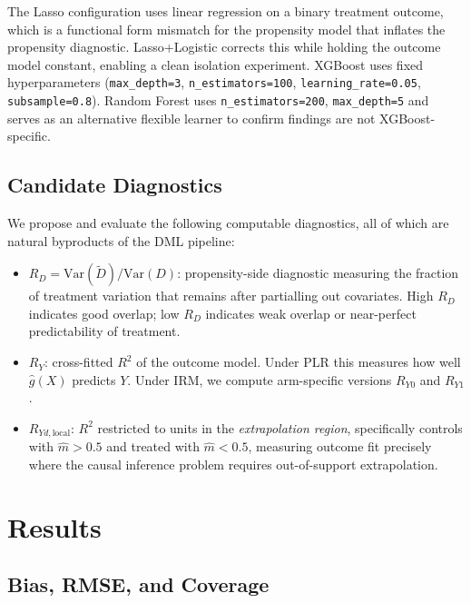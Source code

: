 \documentclass[12pt]{article}
\begin{document}
\noindent The Lasso configuration uses linear regression on a binary treatment outcome, which is a functional form mismatch for the propensity model that inflates the propensity diagnostic. Lasso+Logistic corrects this while holding the outcome model constant, enabling a clean isolation experiment. XGBoost uses fixed hyperparameters (\texttt{max\_depth=3}, \texttt{n\_estimators=100}, \texttt{learning\_rate=0.05}, \texttt{subsample=0.8}). Random Forest uses \texttt{n\_estimators=200}, \texttt{max\_depth=5} and serves as an alternative flexible learner to confirm findings are not XGBoost-specific.

\subsection{Candidate Diagnostics}

We propose and evaluate the following computable diagnostics, all of which are natural byproducts of the DML pipeline:

\begin{itemize}
  \item $R_D = \mathrm{Var}(\tilde{D})/\mathrm{Var}(D)$: propensity-side diagnostic measuring the fraction of treatment variation that remains after partialling out covariates. High $R_D$ indicates good overlap; low $R_D$ indicates weak overlap or near-perfect predictability of treatment.

  \item $R_Y$: cross-fitted $R^2$ of the outcome model. Under PLR this measures how well $\hat{g}(X)$ predicts $Y$. Under IRM, we compute arm-specific versions $R_{Y0}$ and $R_{Y1}$.

  \item $R_{Yd,\text{local}}$: $R^2$ restricted to units in the \emph{extrapolation region}, specifically controls with $\hat{m} > 0.5$ and treated with $\hat{m} < 0.5$, measuring outcome fit precisely where the causal inference problem requires out-of-support extrapolation.
\end{itemize}

\section{Results}
\label{sec:results}

\subsection{Bias, RMSE, and Coverage}
\end{document}

